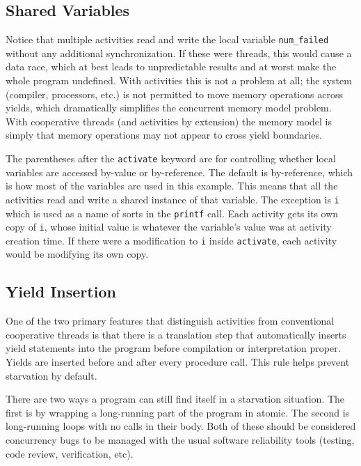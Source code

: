 \documentclass[a4paper,UKenglish,cleveref, autoref]{lipics-v2019}
\begin{document}

\subsection{Shared Variables}

Notice that multiple activities read and write the local variable \texttt{num\_failed} without any additional synchronization.
If these were threads, this would cause a data race, which at best leads to unpredictable results and at worst make the whole program undefined.
With activities this is not a problem at all; the system (compiler, processors, etc.) is not permitted to move memory operations across yields, which dramatically simplifies the concurrent memory model problem.
With cooperative threads (and activities by extension) the memory model is simply that memory operations may not appear to cross yield boundaries.

The parentheses after the \texttt{activate} keyword are for controlling whether local variables are accessed by-value or by-reference.
The default is by-reference, which is how most of the variables are used in this example.
This means that all the activities read and write a shared instance of that variable.
The exception is \texttt{i} which is used as a name of sorts in the \texttt{printf} call.
Each activity gets its own copy of \texttt{i}, whose initial value is whatever the variable's value was at activity creation time.
If there were a modification to \texttt{i} inside \texttt{activate}, each activity would be modifying its own copy.

\subsection{Yield Insertion}

One of the two primary features that distinguish activities from conventional cooperative threads is that there is a translation step that automatically inserts yield statements into the program before compilation or interpretation proper.
Yields are inserted before and after every procedure call.
This rule helps prevent starvation by default.

There are two ways a program can still find itself in a starvation situation.
The first is by wrapping a long-running part of the program in atomic.
The second is long-running loops with no calls in their body.
Both of these should be considered concurrency bugs to be managed with the usual software reliability tools (testing, code review, verification, etc).
\end{document}

